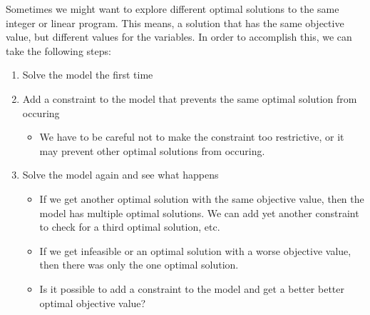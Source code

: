 \documentclass[11pt]{article}
\theoremstyle{definition}
\begin{document}
Sometimes we might want to explore different optimal solutions to the same integer or linear program.  This means, a solution that has the same objective value, but different values for the variables.  In order to accomplish this, we can take the following steps:
\begin{enumerate}
\item Solve the model the first time
\item Add a constraint to the model that prevents the same optimal solution from occuring
\begin{itemize}
\item We have to be careful not to make the constraint too restrictive, or it may prevent other optimal solutions from occuring.
\end{itemize}
\item Solve the model again and see what happens
\begin{itemize}
\item If we get another optimal solution with the same objective value, then the model has multiple optimal solutions.  We can add yet another constraint to check for a third optimal solution, etc.
\item If we get infeasible or an optimal solution with a worse objective value, then there was only the one optimal solution.
\item Is it possible to add a constraint to the model and get a better better optimal objective value?
\end{itemize}
\end{enumerate}
\end{document}

